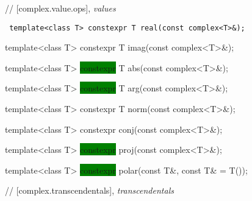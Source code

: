 \documentclass[prd,twocolumn,amsmath,amssymb,nofootinbib,eqsecnum]{revtex4-1}
\newcommand{\code}[1]{{\tt #1}}
\newcommand{\highlight}[1]{\colorbox{green}{\!\!\!\! #1}}
\begin{document}
// [complex.value.ops], {\it values }

\vspace{2ex}

\code{
  	template<class T> constexpr T real(const complex<T>\&);
	
  	template<class T> constexpr T imag(const complex<T>\&);

	\vspace{2ex}

	template<class T> \highlight{constexpr} T abs(const complex<T>\&);
 	
	template<class T> \highlight{constexpr} T arg(const complex<T>\&);
	
	template<class T> constexpr T norm(const complex<T>\&);
	
	\vspace{2ex}
	
	template<class T> constexpr conj(const complex<T>\&);
	
	template<class T> \highlight{constexpr} proj(const complex<T>\&);
	
	template<class T> \highlight{constexpr} polar(const T\&, const T\& = T());	

}

\vspace{2ex}

// [complex.transcendentals], {\it transcendentals}
\end{document}
